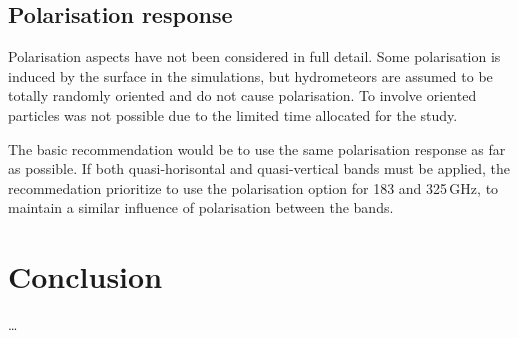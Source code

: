 \documentclass[12pt]{article}
\begin{document}
\subsection{Polarisation response}
%
Polarisation aspects have not been considered in full detail. Some polarisation
is induced by the surface in the simulations, but hydrometeors are assumed to
be totally randomly oriented and do not cause polarisation. To involve oriented
particles was not possible due to the limited time allocated for the study.

The basic recommendation would be to use the same polarisation response as far
as possible. If both quasi-horisontal and quasi-vertical bands must be applied,
the recommedation prioritize to use the polarisation option for 183 and
325\,GHz, to maintain a similar influence of polarisation between the bands.




\section{Conclusion}
%
\dots


{\footnotesize

}
\end{document}
